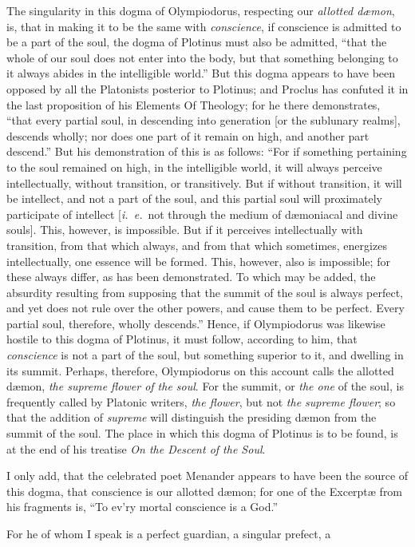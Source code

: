 \documentclass{article}
\begin{document}
{The singularity in this dogma of Olympiodorus, respecting our \textit{allotted
d{\ae}mon}, is, that in making it to be the same with \textit{conscience}, if
conscience is admitted to be a part of the soul, the dogma of Plotinus must
also be admitted, ``that the whole of our soul does not enter into the body,
but that something belonging to it always abides in the intelligible world.''
But this dogma appears to have been opposed by all the Platonists posterior to
Plotinus; and Proclus has confuted it in the last proposition of his
Elements Of Theology; for he there demonstrates, ``that every partial
soul, in descending into generation [or the sublunary realms], descends wholly;
nor does one part of it remain on high, and another part descend.'' But his
demonstration of this is as follows: ``For if something pertaining to the soul
remained on high, in the intelligible world, it will always perceive
intellectually, without transition, or transitively. But if without transition,
it will be intellect, and not a part of the soul, and this partial soul will
proximately participate of intellect [\textit{i.~e.}~not through the medium of
d{\ae}moniacal and divine souls]. This, however, is impossible. But if it
perceives intellectually with transition, from that which always, and from that
which sometimes, energizes intellectually, one essence will be formed. This,
however, also is impossible; for these always differ, as has been demonstrated.
To which may be added, the absurdity resulting from supposing that the summit
of the soul is always perfect, and yet does not rule over the other powers, and
cause them to be perfect. Every partial soul, therefore, wholly descends.''
Hence, if Olympiodorus was likewise hostile to this dogma of Plotinus, it must
follow, according to him, that \textit{conscience} is not a part of the soul,
but something superior to it, and dwelling in its summit. Perhaps, therefore,
Olympiodorus on this account calls the allotted d{\ae}mon, \textit{the supreme
flower of the soul}. For the summit, or \textit{the one} of the soul, is
frequently called by Platonic writers, \textit{the flower}, but not \textit{the
supreme flower}; so that the addition of \textit{supreme} will distinguish the
presiding d{\ae}mon from the summit of the soul. The place in which this dogma
of Plotinus is to be found, is at the end of his treatise \textit{On the
Descent of the Soul}.

I only add, that the celebrated poet Menander appears to have been the source
of this dogma, that conscience is our allotted d{\ae}mon; for one of the
Excerpt{\ae} from his fragments is, ``To ev'ry mortal conscience is a
God.''} For he of whom I speak is a perfect guardian, a singular prefect, a
\end{document}
